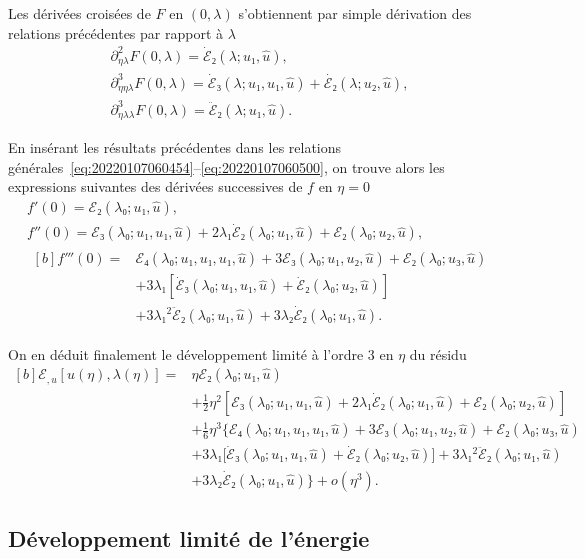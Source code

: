\documentclass[12pt, final]{amsart}
\theoremstyle{definition}
\begin{document}
Les dérivées croisées de \(F\) en \((0, λ)\) s'obtiennent par simple dérivation
des relations précédentes par rapport à \(λ\)
\begin{gather}
  ∂_{ηλ}^2 F(0, λ) = \dot{ℰ}₂(λ; u₁, \hat{u}),\\
  ∂_{ηηλ}^3 F(0, λ) = \dot{ℰ}₃(λ; u₁, u₁, \hat{u}) + \dot{ℰ₂}(λ; u₂, \hat{u}),\\
  ∂_{ηλλ}^3 F(0, λ) = \ddot{ℰ}₂(λ; u₁, \hat{u}).
\end{gather}

En insérant les résultats précédentes dans les relations
générales~\eqref{eq:20220107060454}--\eqref{eq:20220107060500}, on trouve alors
les expressions suivantes des dérivées successives de \(f\) en \(η = 0\)
\begin{gather}
  f'(0) = ℰ₂(λ₀; u₁, \hat{u}),\\
  f''(0) = ℰ₃(λ₀; u₁, u₁, \hat{u}) + 2 λ₁ \dot{ℰ}₂(λ₀; u₁, \hat{u}) +ℰ₂(λ₀; u₂, \hat{u}),\\
  \begin{aligned}[b]
    f'''(0) ={}
    & ℰ₄(λ₀; u₁, u₁, u₁, \hat{u}) + 3ℰ₃(λ₀; u₁, u₂, \hat{u}) + ℰ₂(λ₀ ; u₃, \hat{u})\\
    & + 3 λ₁ [\dot{ℰ}₃(λ₀; u₁, u₁, \hat{u}) + \dot{ℰ}₂(λ₀; u₂, \hat{u})]\\
    & + 3 λ₁^2 \ddot{ℰ}₂(λ₀; u₁, \hat{u}) + 3 λ₂ \dot{ℰ}₂(λ₀; u₁, \hat{u}) .
  \end{aligned}
\end{gather}

On en déduit finalement le développement limité à l'ordre 3 en \(η\) du résidu
\begin{equation}
  \label{eq:20220107080901}
  \begin{aligned}[b]
    ℰ_{, u}[u(η), λ(η)] ={} & η ℰ₂(λ₀; u₁, \hat{u}) \\
    & + \tfrac{1}{2} η^2 [ℰ₃(λ₀; u₁, u₁, \hat{u}) + 2 λ₁ \dot{ℰ}₂(λ₀; u₁, \hat{u}) + ℰ₂(λ₀; u₂, \hat{u})]\\
    & + \tfrac{1}{6} η^3 \bigl\{ ℰ₄(λ₀; u₁, u₁, u₁, \hat{u}) + 3ℰ₃(λ₀; u₁, u₂, \hat{u}) + ℰ₂(λ₀; u₃, \hat{u})\\
    & + 3 λ₁ \bigl[\dot{ℰ}₃(λ₀; u₁, u₁, \hat{u}) + \dot{ℰ}₂(λ₀; u₂, \hat{u})\bigr] + 3 λ₁^2 \ddot{ℰ}₂(λ₀; u₁, \hat{u})\\
    &  + 3 λ₂ \dot{ℰ}₂(λ₀ ; u₁, \hat{u}) \bigr\} + o(η^3).
  \end{aligned}
\end{equation}

\subsection{Développement limité de l'énergie}
\label{sec:20220525053434}
\end{document}
